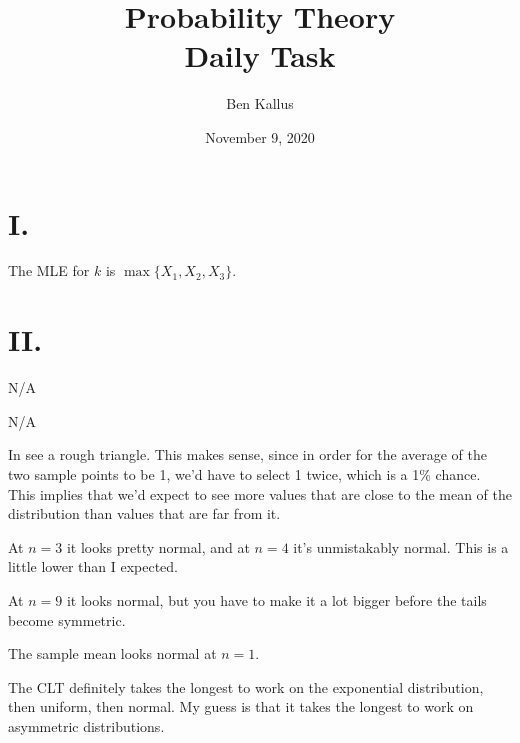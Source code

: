 \documentclass[12pt]{article}
\title{Probability Theory \\ Daily Task}
\author{Ben Kallus}
\date{November 9, 2020}
\begin{document}
\color{white}
\pagecolor{black}
\maketitle
\section*{I.}
The MLE for $k$ is $\max\{X_1, X_2, X_3\}$.

\section*{II.}
 N/A

\medskip
{} N/A

\medskip
{} In see a rough triangle. This makes sense, since in order for the average of the two sample points to be 1, we'd have to select 1 twice, which is a 1\% chance. This implies that we'd expect to see more values that are close to the mean of the distribution than values that are far from it.

\medskip
{} At $n=3$ it looks pretty normal, and at $n=4$ it's unmistakably normal. This is a little lower than I expected.

\medskip
{} At $n=9$ it looks normal, but you have to make it a lot bigger before the tails become symmetric. 

\medskip
{} The sample mean looks normal at $n=1$.

\medskip
{} The CLT definitely takes the longest to work on the exponential distribution, then uniform, then normal. My guess is that it takes the longest to work on asymmetric distributions.
\end{document}
